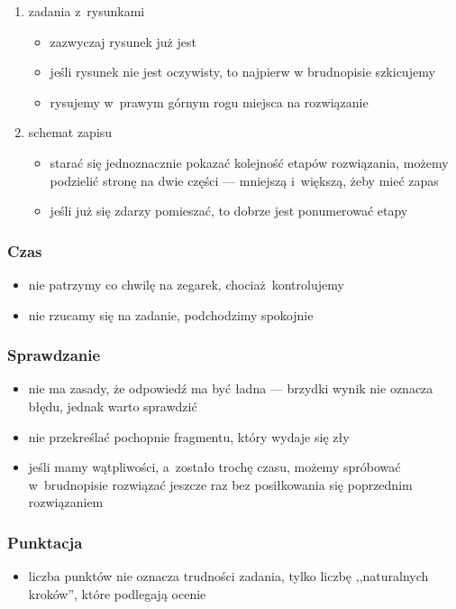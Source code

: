 \begin{enumerate}
\begin{enumerate}[label={\Roman*)}]
\begin{itemize}
                \end{itemize}
            \item zadania z~rysunkami
                \begin{itemize}
                    \item zazwyczaj rysunek już jest
                    \item jeśli rysunek nie jest oczywisty, to najpierw w brudnopisie szkicujemy
                    \item rysujemy w~prawym górnym rogu miejsca na rozwiązanie
                \end{itemize}
            \item schemat zapisu
                \begin{itemize}
                    \item starać się jednoznacznie pokazać kolejność etapów rozwiązania, możemy podzielić stronę na dwie części --- mniejszą i~większą, żeby mieć zapas
                    \item jeśli już się zdarzy pomieszać, to dobrze jest ponumerować etapy
                \end{itemize}
        \end{enumerate}
\end{enumerate}
\subsubsection*{Czas}
\begin{itemize}
    \item nie patrzymy co chwilę na zegarek, chociaż kontrolujemy
    \item nie rzucamy się na zadanie, podchodzimy spokojnie
\end{itemize}
\subsubsection*{Sprawdzanie}
\begin{itemize}
    \item nie ma zasady, że odpowiedź ma być ładna --- brzydki wynik nie oznacza błędu, jednak warto sprawdzić
    \item nie przekreślać pochopnie fragmentu, który wydaje się zły
    \item jeśli mamy wątpliwości, a~zostało trochę czasu, możemy spróbować w~brudnopisie rozwiązać jeszcze raz bez posiłkowania się poprzednim rozwiązaniem
\end{itemize}
\subsubsection*{Punktacja}
\begin{itemize}
    \item liczba punktów nie oznacza trudności zadania, tylko liczbę ,,naturalnych kroków'', które podlegają ocenie
\end{itemize}

